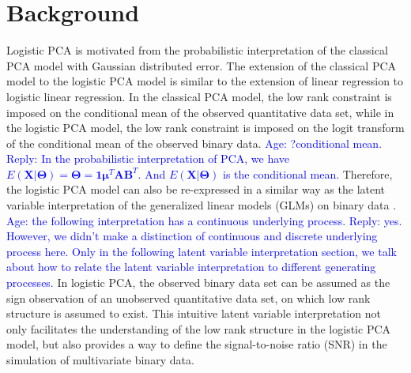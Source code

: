 \section{Background}
Logistic PCA \cite{schein2003generalized,de2006principal} is motivated from the probabilistic interpretation of the classical PCA model with Gaussian distributed error. The extension of the classical PCA model to the logistic PCA model is similar to the extension of linear regression to logistic linear regression. In the classical PCA model, the low rank constraint is imposed on the conditional mean of the observed quantitative data set, while in the logistic PCA model, the low rank constraint is imposed on the logit transform of the conditional mean of the observed binary data. \textcolor{blue}{Age: ?conditional mean. Reply: In the probabilistic interpretation of PCA, we have $E(\mathbf{X}|\mathbf{\Theta}) = \mathbf{\Theta} = \mathbf{1}\bm{\mu}^{T} \mathbf{AB}^{T}$. And $E(\mathbf{X}|\mathbf{\Theta})$ is the conditional mean.} Therefore, the logistic PCA model can also be re-expressed in a similar way as the latent variable interpretation of the generalized linear models (GLMs) on binary data \cite{agresti2013categorical}. \textcolor{blue}{Age: the following interpretation has a continuous underlying process. Reply: yes. However, we didn't make a distinction of continuous and discrete underlying process here. Only in the following latent variable interpretation section, we talk about how to relate the latent variable interpretation to different generating processes.} In logistic PCA, the observed binary data set can be assumed as the sign observation of an unobserved quantitative data set, on which low rank structure is assumed to exist. This intuitive latent variable interpretation not only facilitates the understanding of the low rank structure in the logistic PCA model, but also provides a way to define the signal-to-noise ratio (SNR) in the simulation of multivariate binary data.

